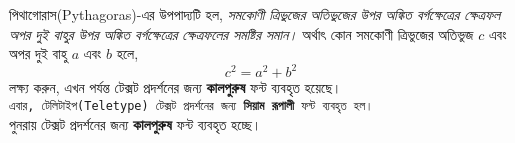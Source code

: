 \documentclass{article}
\begin{document}
পিথাগোরাস(Pythagoras)-এর উপপাদ্যটি হল, \textit{সমকোণী ত্রিভুজের অতিভুজের উপর অঙ্কিত  
বর্গক্ষেত্রের ক্ষেত্রফল অপর দুই বাহুর উপর অঙ্কিত বর্গক্ষেত্রের ক্ষেত্রফলের সমষ্টির সমান।}
অর্থাৎ কোন সমকোণী ত্রিভুজের অতিভুজ $c$ এবং অপর দুই বাহু $a$ এবং $b$ হলে,
\[c^2=a^2+b^2\]
লক্ষ্য করুন, এখন পর্যন্ত টেক্সট প্রদর্শনের জন্য \textbf{কালপুরুষ} ফন্ট ব্যবহৃত হয়েছে।\\
\texttt{এবার, টেলিটাইপ(Teletype) টেক্সট প্রদর্শনের জন্য \textbf{সিয়াম রূপালী} 
ফন্ট ব্যবহৃত হল।}\\
পুনরায় টেক্সট প্রদর্শনের জন্য \textbf{কালপুরুষ} ফন্ট ব্যবহৃত হচ্ছে।
\end{document}
